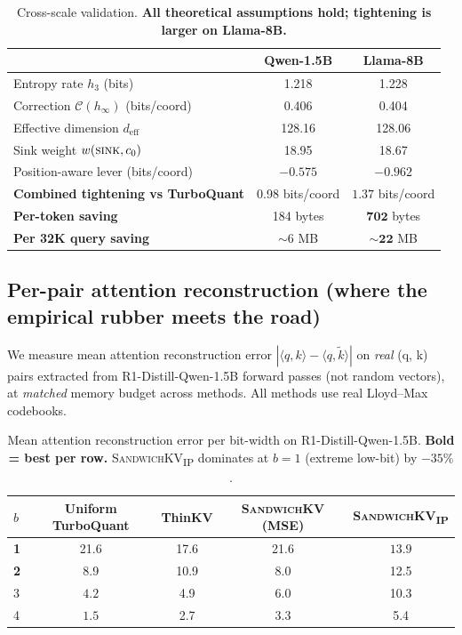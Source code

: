 \documentclass[11pt]{article}
\theoremstyle{definition}
\newcommand{\hinf}{h_\infty}
\newcommand{\sink}{\textsc{sink}}
\newcommand{\eq}{\textsc{SandwichKV}}
\newcommand{\eqp}{\textsc{SandwichKV}\textsubscript{IP}}
\begin{document}
\begin{table}[t]
\centering
\caption{Cross-scale validation. \textbf{All theoretical assumptions hold; tightening is larger on Llama-8B.}}
\label{tab:cross-scale}
\begin{tabular}{lcc}
\toprule
& \textbf{Qwen-1.5B} & \textbf{Llama-8B} \\
\midrule
Entropy rate $h_3$ (bits) & 1.218 & 1.228 \\
Correction $\mathcal{C}(\hinf)$ (bits/coord) & 0.406 & 0.404 \\
Effective dimension $d_\text{eff}$ & 128.16 & 128.06 \\
Sink weight $w(\sink, c_0)$ & 18.95 & 18.67 \\
Position-aware lever (bits/coord) & $-0.575$ & $\boldsymbol{-0.962}$ \\
\midrule
\textbf{Combined tightening vs TurboQuant} & 0.98 bits/coord & $\boldsymbol{1.37}$ bits/coord \\
\textbf{Per-token saving} & 184 bytes & $\boldsymbol{702}$ bytes \\
\textbf{Per 32K query saving} & $\sim 6$ MB & $\boldsymbol{\sim 22}$ MB \\
\bottomrule
\end{tabular}
\end{table}

\subsection{Per-pair attention reconstruction (where the empirical rubber meets the road)}

We measure mean attention reconstruction error $|\langle q, k\rangle - \langle q, \tilde k\rangle|$ on \emph{real} (q, k) pairs extracted from R1-Distill-Qwen-1.5B forward passes (not random vectors), at \emph{matched} memory budget across methods. All methods use real Lloyd--Max codebooks.

\begin{table}[t]
\centering
\caption{Mean attention reconstruction error per bit-width on R1-Distill-Qwen-1.5B. \textbf{Bold = best per row.} \eqp{} dominates at $b{=}1$ (extreme low-bit) by $-35\%$.}
\label{tab:per-pair}
\begin{tabular}{lcccc}
\toprule
\textbf{$b$} & Uniform TurboQuant & ThinKV & \eq{} (MSE) & \eqp{} \\
\midrule
\textbf{1} & 21.6 & 17.6 & 21.6 & $\boldsymbol{13.9}$ \\
\textbf{2} & 8.9  & 10.9 & $\boldsymbol{8.0}$ & 12.5 \\
3 & $\boldsymbol{4.2}$ & 4.9 & 6.0 & 10.3 \\
4 & $\boldsymbol{1.5}$ & 2.7 & 3.3 & 5.4 \\
\bottomrule
\end{tabular}
\end{table}
\end{document}
